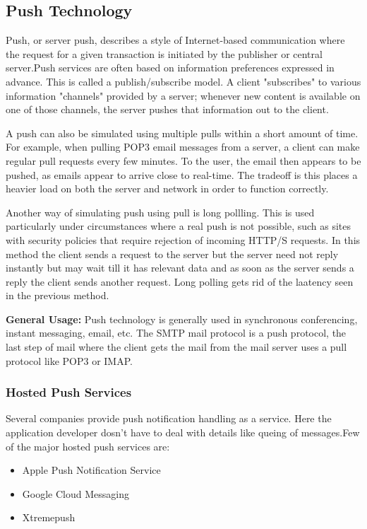 \subsection{Push Technology}
Push, or server push, describes a style of Internet-based communication where the request for a given transaction is initiated by the publisher or central server.Push services are often based on information preferences expressed in advance. This is called a publish/subscribe model. A client "subscribes" to various information "channels" provided by a server; whenever new content is available on one of those channels, the server pushes that information out to the client.

A push can also be simulated using multiple pulls within a short amount of time. For example, when pulling POP3 email messages from a server, a client can make regular pull requests every few minutes. To the user, the email then appears to be pushed, as emails appear to arrive close to real-time. The tradeoff is this places a heavier load on both the server and network in order to function correctly.

Another way of simulating push using pull is long pollling. This is used particularly under circumstances where a real push is not possible, such as sites with security policies that require rejection of incoming HTTP/S requests. In this method the client sends a request to the server but the server need not reply instantly but may wait till it has relevant data and as soon as the server sends a reply the client sends another request. Long polling gets rid of the laatency seen in the previous method.

\textbf{General Usage: }Push technology is generally used in synchronous conferencing, instant messaging, email, etc. The SMTP mail protocol is a push protocol, the last step of mail where the client gets the mail from the mail server uses a pull protocol like POP3 or IMAP.
\subsubsection{Hosted Push Services} 
Several companies provide push notification handling as a service. Here the application developer dosn't have to deal with details like queing of messages.Few of the major hosted push services are:
\begin{itemize}
    \item Apple Push Notification Service
    \item Google Cloud Messaging
    \item Xtremepush
  \end{itemize}
